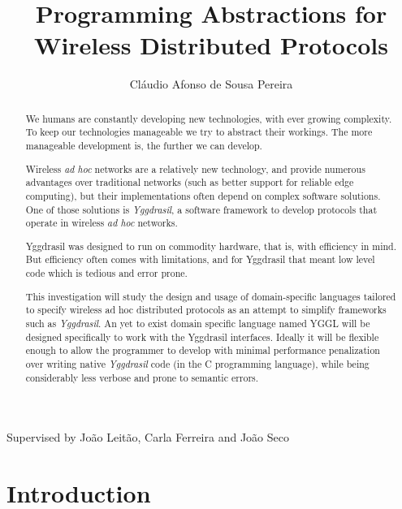 \documentclass[runningheads]{llncs}
\begin{document}
\title{Programming Abstractions for Wireless Distributed Protocols}
\author{Cláudio Afonso de Sousa Pereira}

\maketitle

\begin{center} Supervised by João Leitão, Carla Ferreira and João Seco \end{center}
\begin{abstract}
We humans are constantly developing new technologies, with ever growing complexity.
To keep our technologies manageable we try to abstract their workings. The more manageable development is, the further we can develop.
\par Wireless \textit{ad hoc} networks are a relatively new technology, and provide numerous advantages over traditional networks (such as better support for reliable edge computing), but their implementations often depend on complex software solutions. One of those solutions is \textit{Yggdrasil}, a software framework to develop protocols that operate in wireless \textit{ad hoc} networks.
\par Yggdrasil was designed to run on commodity hardware, that is, with efficiency in mind. But efficiency often comes with limitations, and for Yggdrasil that meant low level code which is tedious and error prone.
\par This investigation will study the design and usage of domain-specific languages tailored to specify wireless ad hoc distributed protocols as an attempt to simplify frameworks such as \textit{Yggdrasil}.
An yet to exist domain specific language named YGGL will be designed specifically to work with the Yggdrasil interfaces.
Ideally it will be flexible enough to allow the programmer to develop with minimal performance penalization over writing native \textit{Yggdrasil} code (in the C programming language), while being considerably less verbose and prone to semantic errors.
\end{abstract}

\section{Introduction}
\end{document}
